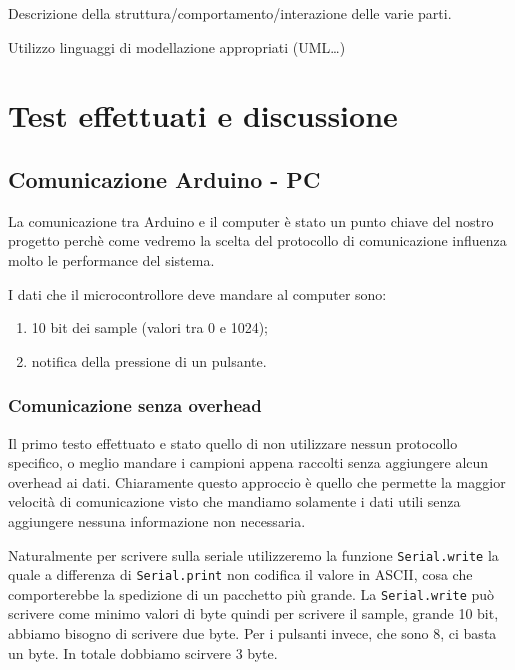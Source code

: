 \documentclass[a4paper,11pt]{article}
\begin{document}
Descrizione della struttura/comportamento/interazione delle varie parti.

Utilizzo linguaggi di modellazione appropriati (UML…)

\section{Test effettuati e discussione}

\subsection{Comunicazione Arduino - PC}
La comunicazione tra Arduino e il computer è stato un punto chiave del nostro progetto perchè come vedremo la scelta del protocollo di comunicazione influenza molto le performance del sistema.

I dati che il microcontrollore deve mandare al computer sono:
\begin{enumerate}
    \item 10 bit dei sample (valori tra 0 e 1024);
    \item notifica della pressione di un pulsante.
\end{enumerate}

\subsubsection{Comunicazione senza overhead}
Il primo testo effettuato e stato quello di non utilizzare nessun protocollo specifico, o meglio mandare i campioni appena raccolti senza aggiungere alcun overhead ai dati. Chiaramente questo approccio è quello che permette la maggior velocità di comunicazione visto che mandiamo solamente i dati utili senza aggiungere nessuna informazione non necessaria.

Naturalmente per scrivere sulla seriale utilizzeremo la funzione \texttt{Serial.write} la quale a differenza di \texttt{Serial.print} non codifica il valore in ASCII, cosa che comporterebbe la spedizione di un pacchetto più grande. La \texttt{Serial.write} può scrivere come minimo valori di byte quindi per scrivere il sample, grande 10 bit, abbiamo bisogno di scrivere due byte. Per i pulsanti invece, che sono 8, ci basta un byte. In totale dobbiamo scirvere 3 byte.
\end{document}
